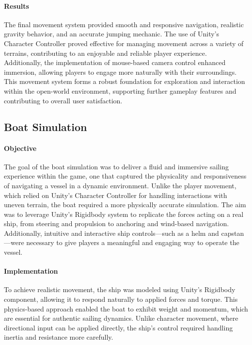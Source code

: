 \documentclass{article}
\begin{document}
\paragraph{Results}\hfill

The final movement system provided smooth and responsive navigation, realistic gravity behavior, and an accurate jumping mechanic. The use of Unity's Character Controller proved effective for managing movement across a variety of terrains, contributing to an enjoyable and reliable player experience.\\

Additionally, the implementation of mouse-based camera control enhanced immersion, allowing players to engage more naturally with their surroundings. This movement system forms a robust foundation for exploration and interaction within the open-world environment, supporting further gameplay features and contributing to overall user satisfaction.










\newpage
\subsection{Boat Simulation}
\paragraph{Objective}\hfill

The goal of the boat simulation was to deliver a fluid and immersive sailing experience within the game, one that captured the physicality and responsiveness of navigating a vessel in a dynamic environment. Unlike the player movement, which relied on Unity's Character Controller for handling interactions with uneven terrain, the boat required a more physically accurate simulation. The aim was to leverage Unity's Rigidbody system to replicate the forces acting on a real ship, from steering and propulsion to anchoring and wind-based navigation. Additionally, intuitive and interactive ship controls—such as a helm and capstan—were necessary to give players a meaningful and engaging way to operate the vessel.

\paragraph{Implementation}\hfill

To achieve realistic movement, the ship was modeled using Unity's Rigidbody component, allowing it to respond naturally to applied forces and torque. This physics-based approach enabled the boat to exhibit weight and momentum, which are essential for authentic sailing dynamics. Unlike character movement, where directional input can be applied directly, the ship's control required handling inertia and resistance more carefully.\\
\end{document}
